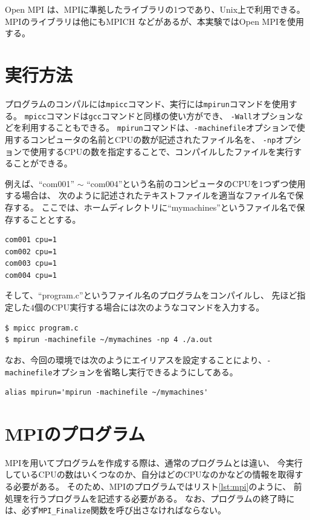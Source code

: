 \documentclass[a4j,titlepage]{jsarticle}
\begin{document}
Open MPI \cite{bib:1} は、MPIに準拠したライブラリの1つであり、Unix上で利用できる。
MPIのライブラリは他にもMPICH \cite{bib:2} などがあるが、本実験ではOpen MPIを使用する。


\section{実行方法}
プログラムのコンパルには\texttt{mpicc}コマンド、実行には\texttt{mpirun}コマンドを使用する。
\texttt{mpicc}コマンドは\texttt{gcc}コマンドと同様の使い方ができ、
\texttt{-Wall}オプションなどを利用することもできる。
\texttt{mpirun}コマンドは、\texttt{-machinefile}オプションで使用するコンピュータの名前とCPUの数が記述されたファイル名を、
\texttt{-np}オプションで使用するCPUの数を指定することで、コンパイルしたファイルを実行することができる。

例えば、``com001'' $\sim$ ``com004''という名前のコンピュータのCPUを1つずつ使用する場合は、
次のように記述されたテキストファイルを適当なファイル名で保存する。
ここでは、ホームディレクトリに``mymachines''というファイル名で保存することとする。

\begin{lstlisting}[style=text]
com001 cpu=1
com002 cpu=1
com003 cpu=1
com004 cpu=1
\end{lstlisting}

そして、``program.c''というファイル名のプログラムをコンパイルし、
先ほど指定した$4$個のCPU実行する場合には次のようなコマンドを入力する。

\begin{lstlisting}[style=text]
$ mpicc program.c
$ mpirun -machinefile ~/mymachines -np 4 ./a.out
\end{lstlisting}

なお、今回の環境では次のようにエイリアスを設定することにより、\texttt{-machinefile}オプションを省略し実行できるようにしてある。

\begin{lstlisting}[style=text]
alias mpirun='mpirun -machinefile ~/mymachines'
\end{lstlisting}


\section{MPIのプログラム}
MPIを用いてプログラムを作成する際は、通常のプログラムとは違い、
今実行しているCPUの数はいくつなのか、自分はどのCPUなのかなどの情報を取得する必要がある。
そのため、MPIのプログラムではリスト\ref{lst:mpi}のように、
前処理を行うプログラムを記述する必要がある。
なお、プログラムの終了時には、必ず\texttt{MPI\_Finalize}関数を呼び出さなければならない。
\end{document}
